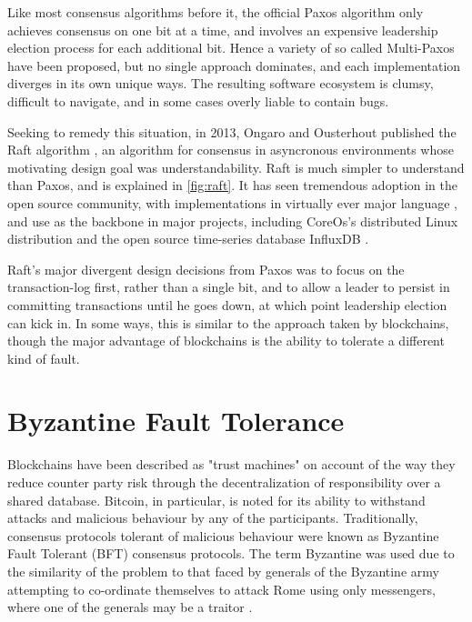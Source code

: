 Like most consensus algorithms before it, the official Paxos algorithm only achieves consensus on one bit at a time,
and involves an expensive leadership election process for each additional bit. 
Hence a variety of so called Multi-Paxos have been proposed, but no single approach dominates, 
and each implementation diverges in its own unique ways. 
The resulting software ecosystem is clumsy, difficult to navigate, and in some cases overly liable to contain bugs.

Seeking to remedy this situation, in 2013, Ongaro and Ousterhout published the Raft algorithm \cite{raft},
an algorithm for consensus in asyncronous environments whose motivating design goal was understandability.
Raft is much simpler to understand than Paxos, and is explained in \ref{fig:raft}. 
It has seen tremendous adoption in the open source community, with implementations in virtually ever major language \cite{raft.github.io},
and use as the backbone in major projects, including CoreOs's distributed Linux distribution \cite{coreos_raft} and the open source time-series database InfluxDB \cite{influxdb_raft}.

Raft's major divergent design decisions from Paxos was to focus on the transaction-log first, rather than a single bit,
and to allow a leader to persist in committing transactions until he goes down, at which point leadership election can kick in. 
In some ways, this is similar to the approach taken by blockchains, 
though the major advantage of blockchains is the ability to tolerate a different kind of fault.

\section{Byzantine Fault Tolerance}

Blockchains have been described as "trust machines" \cite{economist_blockchains} on account of the way they reduce counter party risk through the decentralization of responsibility over a shared database.
Bitcoin, in particular, is noted for its ability to withstand attacks and malicious behaviour by any of the participants. 
Traditionally, consensus protocols tolerant of malicious behaviour were known as Byzantine Fault Tolerant (BFT) consensus protocols.
The term Byzantine was used due to the similarity of the problem to that faced by generals of the Byzantine army attempting to co-ordinate themselves to attack Rome using only messengers,
where one of the generals may be a traitor \cite{lamport1982byzantine}.

